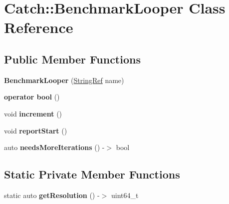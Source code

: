 \hypertarget{class_catch_1_1_benchmark_looper}{}\section{Catch\+:\+:Benchmark\+Looper Class Reference}
\label{class_catch_1_1_benchmark_looper}
\subsection*{Public Member Functions}
\begin{DoxyCompactItemize}
\item 
\mbox{\label{class_catch_1_1_benchmark_looper_ab9ba6397306a70082f39e63a8a71bde6}} 
{\bfseries Benchmark\+Looper} (\mbox{\hyperlink{class_catch_1_1_string_ref}{String\+Ref}} name)
\item 
\mbox{\label{class_catch_1_1_benchmark_looper_a54da41bada9da038dc05faf41d746765}} 
{\bfseries operator bool} ()
\item 
\mbox{\label{class_catch_1_1_benchmark_looper_a210552aff5b19408637444d4bb35d59c}} 
void {\bfseries increment} ()
\item 
\mbox{\label{class_catch_1_1_benchmark_looper_a0697d1b266112b110edf2025b82c4e77}} 
void {\bfseries report\+Start} ()
\item 
\mbox{\label{class_catch_1_1_benchmark_looper_a97bd944521f519b1593a5d1d2f9998fa}} 
auto {\bfseries needs\+More\+Iterations} () -\/$>$ bool
\end{DoxyCompactItemize}
\subsection*{Static Private Member Functions}
\begin{DoxyCompactItemize}
\item 
\mbox{\label{class_catch_1_1_benchmark_looper_a45fd79f05ac1fb21dcfb3a81cf052705}} 
static auto {\bfseries get\+Resolution} () -\/$>$ uint64\+\_\+t
\end{DoxyCompactItemize}

